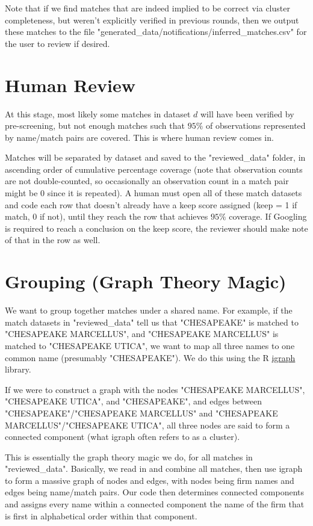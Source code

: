 \documentclass{article}
\begin{document}
Note that if we find matches that are indeed implied to be correct via cluster completeness, but weren't explicitly verified in previous rounds, then we output these matches to the file "generated\_data/notifications/inferred\_matches.csv" for the user to review if desired. 

\section{Human Review}

At this stage, most likely some matches in dataset $d$ will have been verified by pre-screening, but not enough matches such that $95\%$ of observations represented by name/match pairs are covered. This is where human review comes in. 

Matches will be separated by dataset and saved to the "reviewed\_data" folder, in ascending order of cumulative percentage coverage (note that observation counts are not double-counted, so occasionally an observation count in a match pair might be 0 since it is repeated). A human must open all of these match datasets and code each row that doesn't already have a keep score assigned (keep = 1 if match, 0 if not), until they reach the row that achieves $95\%$ coverage. If Googling is required to reach a conclusion on the keep score, the reviewer should make note of that in the row as well. 

\section{Grouping (Graph Theory Magic)}
\label{sec:graph-theory}

We want to group together matches under a shared name. For example, if the match datasets in "reviewed\_data" tell us that "CHESAPEAKE" is matched to "CHESAPEAKE MARCELLUS", and "CHESAPEAKE MARCELLUS" is matched to "CHESAPEAKE UTICA", we want to map all three names to one common name (presumably "CHESAPEAKE"). We do this using the R \href{https://cran.r-project.org/web/packages/igraph/igraph.pdf}{igraph} library. 

If we were to construct a graph with the nodes "CHESAPEAKE MARCELLUS", "CHESAPEAKE UTICA", and "CHESAPEAKE", and edges between "CHESAPEAKE"/"CHESAPEAKE MARCELLUS" and "CHESAPEAKE MARCELLUS"/"CHESAPEAKE UTICA", all three nodes are said to form a connected component (what igraph often refers to as a cluster). 

This is essentially the graph theory magic we do, for all matches in "reviewed\_data". Basically, we read in and combine all matches, then use igraph to form a massive graph of nodes and edges, with nodes being firm names and edges being name/match pairs. Our code then determines connected components and assigns every name within a connected component the name of the firm that is first in alphabetical order within that component. 
\end{document}
